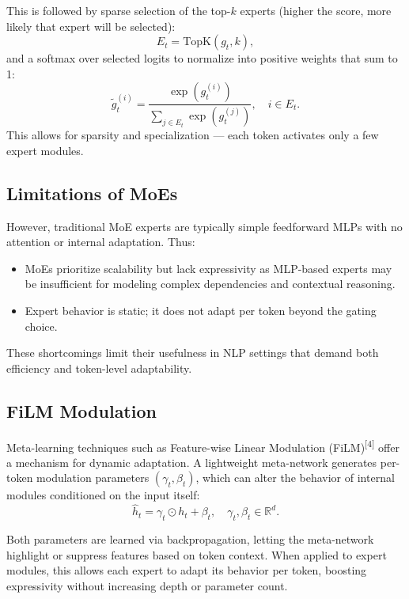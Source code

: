 \documentclass{article}
\begin{document}
\noindent
This is followed by sparse selection of the top-$k$ experts (higher the score, more likely that expert will be selected):
\[
{E}_t = \text{TopK}(g_t, k),
\]
and a softmax over selected logits to normalize into positive weights that sum to 1:
\[
\tilde{g}_t^{(i)} = \frac{\exp(g_t^{(i)})}{\sum_{j \in {E}_t} \exp(g_t^{(j)})}, \quad i \in {E}_t.
\]
This allows for sparsity and specialization --- each token activates only a few expert modules. 

\subsection{Limitations of MoEs}
However, traditional MoE experts are typically simple feedforward MLPs with no attention or internal adaptation. Thus: 
\begin{itemize}
    \item MoEs prioritize scalability but lack expressivity as MLP-based experts may be insufficient for modeling complex dependencies and contextual reasoning.
    \item Expert behavior is static; it does not adapt per token beyond the gating choice. 
    
\end{itemize}


\noindent
These shortcomings limit their usefulness in NLP settings that demand both efficiency and token-level adaptability. 

\subsection{FiLM Modulation}

Meta-learning techniques such as Feature-wise Linear Modulation (FiLM)\textsuperscript{[4]} offer a mechanism for dynamic adaptation. A lightweight meta-network generates per-token modulation parameters \((\gamma_t, \beta_t)\), which can alter the behavior of internal modules conditioned on the input itself:
\[
\hat{h}_t = \gamma_t \odot h_t + \beta_t, \quad \gamma_t, \beta_t \in \mathbb{R}^d.
\]

\noindent
Both parameters are learned via backpropagation, letting the meta-network highlight or suppress features based on token context. When applied to expert modules, this allows each expert to adapt its behavior per token, boosting expressivity without increasing depth or parameter count. 




\vspace{3pt}
\end{document}
